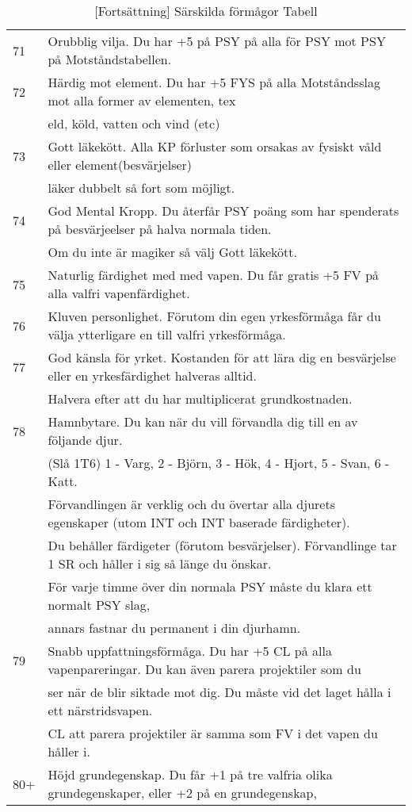 \documentclass[a4paper, 10pt, titlepage]{article}
\begin{document}
\begin{table}[hbp]
  \caption{[Fortsättning] Särskilda förmågor Tabell}
 \begin{tabular}{|l|l|}
   71        & Orubblig vilja. Du har +5 på PSY på alla för PSY mot PSY på Motståndstabellen. \\
   72        & Härdig mot element. Du har +5 FYS på alla Motståndsslag mot alla former av elementen, tex \\
   ~         & eld, köld, vatten och vind (etc) \\
   73        & Gott läkekött. Alla KP förluster som orsakas av fysiskt våld eller element(besvärjelser)  \\
   ~         & läker dubbelt så fort som möjligt. \\
   74        & God Mental Kropp. Du återfår PSY poäng som har spenderats på besvärjeelser på halva normala tiden. \\
   ~         & Om du inte är magiker så välj Gott läkekött. \\
   75        & Naturlig färdighet med med vapen. Du får gratis +5 FV på alla valfri vapenfärdighet. \\
   76        & Kluven personlighet. Förutom din egen yrkesförmåga får du välja ytterligare en till valfri yrkesförmåga. \\
   77        & God känsla för yrket. Kostanden för att lära dig en besvärjelse eller en yrkesfärdighet halveras alltid. \\
   ~         & Halvera efter att du har multiplicerat grundkostnaden. \\
   78        & Hamnbytare. Du kan när du vill förvandla dig till en av följande djur. \\
   ~         & (Slå 1T6) 1 - Varg, 2 - Björn, 3 - Hök, 4 - Hjort, 5 - Svan, 6 - Katt. \\
   ~         & Förvandlingen är verklig och du övertar alla djurets egenskaper (utom INT och INT baserade färdigheter). \\
   ~         & Du behåller färdigeter (förutom besvärjelser). Förvandlinge tar 1 SR och håller i sig så länge du önskar. \\
   ~         & För varje timme över din normala PSY måste du klara ett normalt PSY slag,  \\
   ~         & annars fastnar du permanent i din djurhamn. \\
   79        & Snabb uppfattningsförmåga. Du har +5 CL på alla vapenpareringar. Du kan även parera projektiler som du  \\
   ~         & ser när de blir siktade mot dig. Du måste vid det laget hålla i ett närstridsvapen. \\
   ~         & CL att parera projektiler är samma som FV i det vapen du håller i. \\
   80+       & Höjd grundegenskap. Du får +1 på tre valfria olika grundegenskaper, eller +2 på en grundegenskap, \\
   \hline
 \end{tabular}
\end{table}
\end{document}
